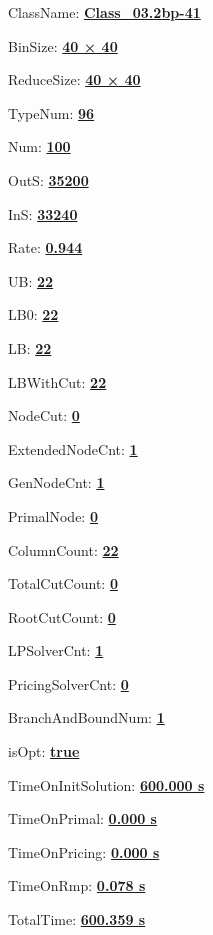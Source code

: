 \documentclass[11pt]{article}
\begin{document}
\pagestyle{empty}


ClassName: \underline{\textbf{Class_03.2bp-41}}
\par
BinSize: \underline{\textbf{40 × 40}}
\par
ReduceSize: \underline{\textbf{40 × 40}}
\par
TypeNum: \underline{\textbf{96}}
\par
Num: \underline{\textbf{100}}
\par
OutS: \underline{\textbf{35200}}
\par
InS: \underline{\textbf{33240}}
\par
Rate: \underline{\textbf{0.944}}
\par
UB: \underline{\textbf{22}}
\par
LB0: \underline{\textbf{22}}
\par
LB: \underline{\textbf{22}}
\par
LBWithCut: \underline{\textbf{22}}
\par
NodeCut: \underline{\textbf{0}}
\par
ExtendedNodeCnt: \underline{\textbf{1}}
\par
GenNodeCnt: \underline{\textbf{1}}
\par
PrimalNode: \underline{\textbf{0}}
\par
ColumnCount: \underline{\textbf{22}}
\par
TotalCutCount: \underline{\textbf{0}}
\par
RootCutCount: \underline{\textbf{0}}
\par
LPSolverCnt: \underline{\textbf{1}}
\par
PricingSolverCnt: \underline{\textbf{0}}
\par
BranchAndBoundNum: \underline{\textbf{1}}
\par
isOpt: \underline{\textbf{true}}
\par
TimeOnInitSolution: \underline{\textbf{600.000 s}}
\par
TimeOnPrimal: \underline{\textbf{0.000 s}}
\par
TimeOnPricing: \underline{\textbf{0.000 s}}
\par
TimeOnRmp: \underline{\textbf{0.078 s}}
\par
TotalTime: \underline{\textbf{600.359 s}}
\par
\newpage


\end{document}
